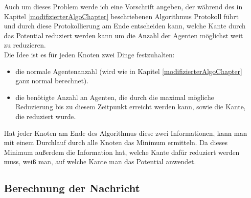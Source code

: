 	Auch um dieses Problem werde ich eine Vorschrift angeben, der während des in Kapitel \ref{modifizierterAlgoChapter} beschriebenen Algorithmus Protokoll führt und durch diese Protokollierung am Ende entscheiden kann, welche Kante durch das Potential reduziert werden kann um die Anzahl der Agenten möglichst weit zu reduzieren.\\
	Die Idee ist es für jeden Knoten zwei Dinge festzuhalten: 
	\begin{itemize}
		\item die normale Agentenanzahl (wird wie in Kapitel \ref{modifizierterAlgoChapter} ganz normal berechnet).
		\item die benötigte Anzahl an  Agenten, die durch die maximal mögliche Reduzierung bis zu diesem Zeitpunkt erreicht werden kann, sowie die Kante, die reduziert wurde.
	\end{itemize}
	Hat jeder Knoten am Ende des Algorithmus diese zwei Informationen, kann man mit einem Durchlauf durch alle Knoten das Minimum ermitteln. Da dieses Minimum außerdem die Information hat, welche Kante dafür reduziert werden muss, weiß man, auf welche Kante man das Potential anwendet.
	
	\subsection*{Berechnung der Nachricht}
	

